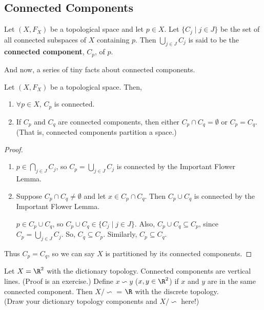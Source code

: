 \subsection{Connected Components}
\begin{definition} Let $(X, F_X)$ be a topological space and let $p\in X$. Let $\{C_j\mid j\in J\}$ be the set of all connected subspaces of $X$ containing $p$. Then ${\displaystyle\bigcup_{j\in J}C_j}$ is said to be the \textbf{connected component}, $C_p$, of $p$.
\end{definition}

And now, a series of tiny facts about connected components.
\begin{smallfact}
Let $(X, F_X)$ be a topological space. Then,
\begin{enumerate}
\item $\forall p \in X$, $C_p$ is connected.
\item If $C_p$ and $C_q$ are connected components, then either $C_p\cap C_q = \emptyset$ or $C_p = C_q$. (That is, connected components partition a space.)
\end{enumerate}
\begin {proof}
\begin{enumerate}
\item $p\in {\displaystyle\bigcap_{j\in J} C_j}$, so $C_p = {\displaystyle\bigcup_{j\in J} C_j}$ is connected by the Important Flower Lemma.
\item Suppose $C_p \cap C_q \neq \emptyset$ and let $x\in C_p \cap C_q$. Then $C_p \cup C_q$ is connected by the Important Flower Lemma.

$p\in C_p \cup C_q$, so $C_p \cup C_q \in \{C_j\mid j\in J\}$.  Also, $C_p \cup C_q \subseteq C_p$, since $C_p =  {\displaystyle\bigcup_{j\in J} C_j}$. So, $C_q \subseteq C_p$. Similarly, $C_p \subseteq C_q$.
\end{enumerate}
Thus $C_p = C_q$, so we can say $X$ is partitioned by its connected components.
\end{proof}
\end{smallfact}

\begin{example} 
Let $X = \R^2$ with the dictionary topology. Connected components are vertical lines. (Proof is an exercise.) Define $x\backsim y$ ($x, y \in \R^2$) if $x$ and $y$ are in the same connected component. Then $X/\backsim$ = $\R$ with the discrete topology. \\
(Draw your dictionary topology components and $X/\backsim$ here!)\\
\placeholder
\end{example}

